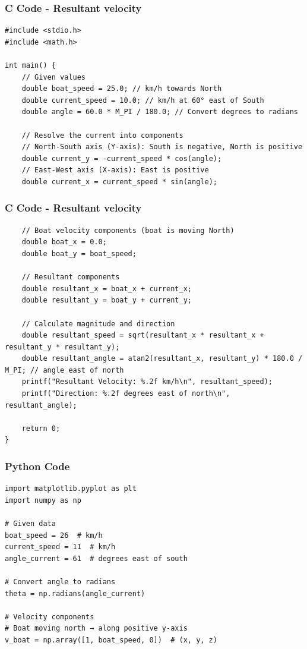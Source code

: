 \documentclass{beamer}
\begin{document}
\begin{frame}[fragile]
    \frametitle{C Code - Resultant velocity}

    \begin{lstlisting}
#include <stdio.h>
#include <math.h>

int main() {
    // Given values
    double boat_speed = 25.0; // km/h towards North
    double current_speed = 10.0; // km/h at 60° east of South
    double angle = 60.0 * M_PI / 180.0; // Convert degrees to radians

    // Resolve the current into components
    // North-South axis (Y-axis): South is negative, North is positive
    double current_y = -current_speed * cos(angle);
    // East-West axis (X-axis): East is positive
    double current_x = current_speed * sin(angle);
     \end{lstlisting}
\end{frame}
\begin{frame}[fragile]
    \frametitle{C Code - Resultant velocity}

    \begin{lstlisting}
    // Boat velocity components (boat is moving North)
    double boat_x = 0.0;
    double boat_y = boat_speed;

    // Resultant components
    double resultant_x = boat_x + current_x;
    double resultant_y = boat_y + current_y;

    // Calculate magnitude and direction
    double resultant_speed = sqrt(resultant_x * resultant_x + resultant_y * resultant_y);
    double resultant_angle = atan2(resultant_x, resultant_y) * 180.0 / M_PI; // angle east of north
    printf("Resultant Velocity: %.2f km/h\n", resultant_speed);
    printf("Direction: %.2f degrees east of north\n", resultant_angle);

    return 0;
}

    \end{lstlisting}
\end{frame}



\begin{frame}[fragile]
    \frametitle{Python Code}
    \begin{lstlisting}
import matplotlib.pyplot as plt
import numpy as np

# Given data
boat_speed = 26  # km/h
current_speed = 11  # km/h
angle_current = 61  # degrees east of south

# Convert angle to radians
theta = np.radians(angle_current)

# Velocity components
# Boat moving north → along positive y-axis
v_boat = np.array([1, boat_speed, 0])  # (x, y, z)

    \end{lstlisting}
\end{frame}
\end{document}
